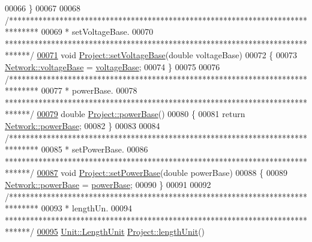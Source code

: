 \begin{DoxyCode}
00066 \}
00067 
00068 \textcolor{comment}{/*******************************************************************************}
00069 \textcolor{comment}{ * setVoltageBase.}
00070 \textcolor{comment}{ ******************************************************************************/}
\hypertarget{project_8cpp_source_l00071}{}\hyperlink{class_project_a494c3e89851f754188c7abaedbf77ef6}{00071} \textcolor{keywordtype}{void} \hyperlink{class_project_a494c3e89851f754188c7abaedbf77ef6}{Project::setVoltageBase}(\textcolor{keywordtype}{double} voltageBase)
00072 \{
00073   \hyperlink{group___graphics_ga7c1e79d9ac69df9a69f24eaf092fd5e5}{Network::voltageBase} = \hyperlink{class_project_a4e857ccb6162f57f5d72f4e7199e4573}{voltageBase};
00074 \}
00075 
00076 \textcolor{comment}{/*******************************************************************************}
00077 \textcolor{comment}{ * powerBase.}
00078 \textcolor{comment}{ ******************************************************************************/}
\hypertarget{project_8cpp_source_l00079}{}\hyperlink{class_project_a1a417c6832182389fb501b92cade3f9d}{00079} \textcolor{keywordtype}{double} \hyperlink{class_project_a1a417c6832182389fb501b92cade3f9d}{Project::powerBase}()
00080 \{
00081   \textcolor{keywordflow}{return} \hyperlink{group___graphics_ga74bb7aa495d422f1f092acdf958df989}{Network::powerBase};
00082 \}
00083 
00084 \textcolor{comment}{/*******************************************************************************}
00085 \textcolor{comment}{ * setPowerBase.}
00086 \textcolor{comment}{ ******************************************************************************/}
\hypertarget{project_8cpp_source_l00087}{}\hyperlink{class_project_abb4df805b3cd3af509a41e657eb4bb83}{00087} \textcolor{keywordtype}{void} \hyperlink{class_project_abb4df805b3cd3af509a41e657eb4bb83}{Project::setPowerBase}(\textcolor{keywordtype}{double} powerBase)
00088 \{
00089   \hyperlink{group___graphics_ga74bb7aa495d422f1f092acdf958df989}{Network::powerBase} = \hyperlink{class_project_a1a417c6832182389fb501b92cade3f9d}{powerBase};
00090 \}
00091 
00092 \textcolor{comment}{/*******************************************************************************}
00093 \textcolor{comment}{ * lengthUn.}
00094 \textcolor{comment}{ ******************************************************************************/}
\hypertarget{project_8cpp_source_l00095}{}\hyperlink{class_project_a40cd2f59a4a708897e5997942c046f4d}{00095} \hyperlink{class_unit_a8c8921f7b225ad6063b1cb573425b9a0}{Unit::LengthUnit} \hyperlink{class_project_a40cd2f59a4a708897e5997942c046f4d}{Project::lengthUnit}()

\end{DoxyCode}

